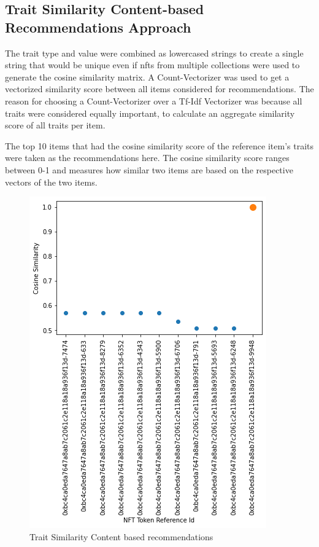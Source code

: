 \documentclass[conference]{IEEEtran}
\begin{document}
\subsection{Trait Similarity Content-based Recommendations Approach}

The trait type and value were combined as lowercased strings to create a single string that would be unique even if \gls{nft}s from multiple collections were used to generate the cosine similarity matrix. A Count-Vectorizer was used to get a vectorized similarity score between all items considered for recommendations. The reason for choosing a Count-Vectorizer over a Tf-Idf Vectorizer was because all traits were considered equally important, to calculate an aggregate similarity score of all traits per item.

The top 10 items that had the cosine similarity score of the reference item's traits were taken as the recommendations here. The cosine similarity score ranges between 0-1 and measures how similar two items are based on the respective vectors of the two items.

\begin{figure}[htbp]
\centerline{\includegraphics[width=\linewidth]{images/Cosine_Similarities_of_Recommended_NFTs-Trait_Content_Based_Recomendations_Model.png}}
\caption{Trait Similarity Content based recommendations}
\label{fig:trait-content-output}
\end{figure}
\end{document}
